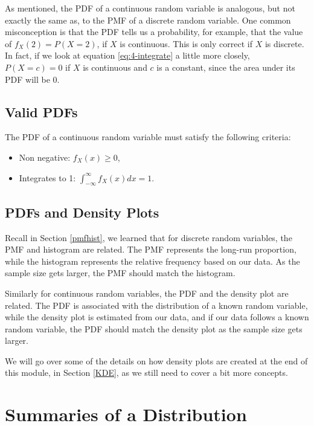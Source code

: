 \documentclass[
]{book}
\providecommand{\tightlist}{%
  \setlength{\itemsep}{0pt}\setlength{\parskip}{0pt}}
\begin{document}
As mentioned, the PDF of a continuous random variable is analogous, but not exactly the same as, to the PMF of a discrete random variable. One common misconception is that the PDF tells us a probability, for example, that the value of \(f_X(2) = P(X=2)\), if \(X\) is continuous. This is only correct if \(X\) is discrete. In fact, if we look at equation \eqref{eq:4-integrate} a little more closely, \(P(X=c) = 0\) if \(X\) is continuous and \(c\) is a constant, since the area under its PDF will be 0.

\subsection{Valid PDFs}\label{valid-pdfs}

The PDF of a continuous random variable must satisfy the following criteria:

\begin{itemize}
\tightlist
\item
  Non negative: \(f_X(x) \geq 0\),
\item
  Integrates to 1: \(\int_{-\infty}^{\infty}f_X(x) dx = 1\).
\end{itemize}

\subsection{PDFs and Density Plots}\label{pdfs-and-density-plots}

Recall in Section \ref{pmfhist}, we learned that for discrete random variables, the PMF and histogram are related. The PMF represents the long-run proportion, while the histogram represents the relative frequency based on our data. As the sample size gets larger, the PMF should match the histogram.

Similarly for continuous random variables, the PDF and the density plot are related. The PDF is associated with the distribution of a known random variable, while the density plot is estimated from our data, and if our data follows a known random variable, the PDF should match the density plot as the sample size gets larger.

We will go over some of the details on how density plots are created at the end of this module, in Section \ref{KDE}, as we still need to cover a bit more concepts.

\section{Summaries of a Distribution}\label{summaries-of-a-distribution}
\end{document}
